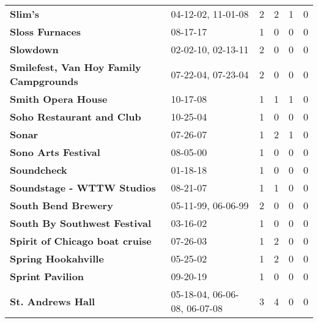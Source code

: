\begin{supertabular}{llllll}
                                                      \textbf{Slim's} &            04-12-02, 11-01-08 &  2 &   2 &  1 &  0 \\
                                              \textbf{Sloss Furnaces} &                      08-17-17 &  1 &   0 &  0 &  0 \\
                                                    \textbf{Slowdown} &            02-02-10, 02-13-11 &  2 &   0 &  0 &  0 \\
                       \textbf{Smilefest, Van Hoy Family Campgrounds} &            07-22-04, 07-23-04 &  2 &   0 &  0 &  0 \\
                                           \textbf{Smith Opera House} &                      10-17-08 &  1 &   1 &  1 &  0 \\
                                    \textbf{Soho Restaurant and Club} &                      10-25-04 &  1 &   0 &  0 &  0 \\
                                                       \textbf{Sonar} &                      07-26-07 &  1 &   2 &  1 &  0 \\
                                          \textbf{Sono Arts Festival} &                      08-05-00 &  1 &   0 &  0 &  0 \\
                                                  \textbf{Soundcheck} &                      01-18-18 &  1 &   0 &  0 &  0 \\
                                   \textbf{Soundstage - WTTW Studios} &                      08-21-07 &  1 &   1 &  0 &  0 \\
                                          \textbf{South Bend Brewery} &            05-11-99, 06-06-99 &  2 &   0 &  0 &  0 \\
                                 \textbf{South By Southwest Festival} &                      03-16-02 &  1 &   0 &  0 &  0 \\
                               \textbf{Spirit of Chicago boat cruise} &                      07-26-03 &  1 &   2 &  0 &  0 \\
                                          \textbf{Spring Hookahville} &                      05-25-02 &  1 &   2 &  0 &  0 \\
                                             \textbf{Sprint Pavilion} &                      09-20-19 &  1 &   0 &  0 &  0 \\
                                            \textbf{St. Andrews Hall} &  05-18-04, 06-06-08, 06-07-08 &  3 &   4 &  0 &  0 \\

\end{supertabular}
